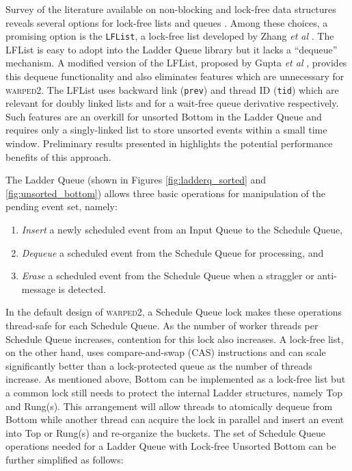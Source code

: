\documentclass[11pt]{book}
\begin{document}
Survey of the literature available on non-blocking and lock-free data structures reveals several options for
lock-free lists and queues \cite{valois-95, michael-95, michael-96, michael-98, michael-02, michael-04,
  fomitchev-04, zhang-13, harris-01}.  Among these choices, a promising option is the \texttt{LFList}, a
lock-free list developed by Zhang \emph{et al} \cite{zhang-13}.  The LFList is easy to adopt into the Ladder
Queue library but it lacks a ``dequeue'' mechanism.  A modified version of the LFList, proposed by Gupta
\emph{et al} \cite{gupta-14}, provides this dequeue functionality and also eliminates features which are
unnecessary for \textsc{warped2}.  The LFList uses backward link (\texttt{prev}) and thread ID (\texttt{tid})
which are relevant for doubly linked lists and for a wait-free queue derivative respectively.  Such features
are an overkill for unsorted Bottom in the Ladder Queue and requires only a singly-linked list to store
unsorted events within a small time window.  Preliminary results presented in \cite{gupta-14} highlights the
potential performance benefits of this approach.

The Ladder Queue (shown in Figures \ref{fig:ladderq_sorted} and \ref{fig:unsorted_bottom}) allows three basic
operations for manipulation of the pending event set, namely:

\begin{enumerate}
\item \emph{Insert} a newly scheduled event from an Input Queue to the Schedule Queue,
\item \emph{Dequeue} a scheduled event from the Schedule Queue for processing, and
\item \emph{Erase} a scheduled event from the Schedule Queue when a straggler or anti-message is detected.
\end{enumerate}

In the default design of \textsc{warped2}, a Schedule Queue lock makes these operations thread-safe for each
Schedule Queue.  As the number of worker threads per Schedule Queue increases, contention for this lock also
increases.  A lock-free list, on the other hand, uses compare-and-swap (CAS) instructions and can scale
significantly better than a lock-protected queue as the number of threads increase.  As mentioned above,
Bottom can be implemented as a lock-free list but a common lock still needs to protect the internal Ladder
structures, namely Top and Rung(s).  This arrangement will allow threads to atomically dequeue from Bottom
while another thread can acquire the lock in parallel and insert an event into Top or Rung(s) and re-organize
the buckets.  The set of Schedule Queue operations needed for a Ladder Queue with Lock-free Unsorted Bottom
can be further simplified as follows:
\end{document}
